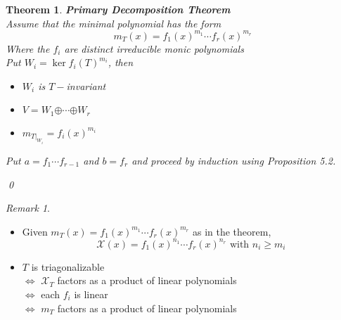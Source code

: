 \documentclass[11pt, a4paper]{report}
\makeatletter
\numberwithin{equation}{section}
\renewcommand{\chi}{\mathcal{X}}
\newcommand{\opl}{\boldsymbol{\oplus}}
\numberwithin{equation}{subsection}
\theoremstyle{plain}
\newtheorem{thm}{Theorem}[chapter] %
\theoremstyle{definition}
\theoremstyle{remark}
\newtheorem*{rem}{Remark}
\newtheorem*{prf}{Proof}
\renewenvironment{prf}[1][\proofname]{\par
  \vspace{-\topsep}%
  \normalfont
  \topsep0pt \partopsep0pt %
  \trivlist
  \item[\hskip\labelsep
        \itshape
    #1\@addpunct{.}]\ignorespaces
}{%
  \popQED\endtrivlist\@endpefalse
  \addvspace{6pt plus 6pt} %
}
\newcommand{\pr}[1]{\begin{adjustwidth}{1cm}{} \begin{prf} #1 \end{prf} \end{adjustwidth}}
\makeatother
\begin{document}
\newpage

\begin{thm}\textnormal{\textbf{Primary Decomposition Theorem}}\\
Assume that the minimal polynomial has the form
$$m_T(x) = f_1(x)^{m_1} \cdots f_r(x)^{m_r}$$
Where the $f_i$ are distinct irreducible monic polynomials\\
Put $W_i = \ker f_i(T)^{m_i}$, then
\begin{itemize}
\item $W_i$ is $T-$invariant
\item $V = W_1 \opl \cdots \opl W_r$
\item $m_{T|_{W_i}} = f_i(x)^{m_i}$
\end{itemize}

\pr{
Put $a = f_1 \cdots f_{r-1}$ and $b = f_r$ and proceed by induction using Proposition 5.2.
}\qed
\end{thm}

\begin{rem}${}$
\begin{itemize}
\item Given $m_T(x) = f_1(x)^{m_1} \cdots f_r(x)^{m_r}$ as in the theorem, $$\chi(x) = f_1(x)^{n_1} \cdots f_r(x)^{n_r} \text{ with } n_i \geq m_i$$
\pr{
}\vfill
\item 	$T$ is triagonalizable\\
		$\Leftrightarrow$ $\chi_T$ factors as a product of linear polynomials\\
		$\Leftrightarrow$ each $f_i$ is linear\\
		$\Leftrightarrow$ $m_T$ factors as a product of linear polynomials
\end{itemize}
\end{rem}



\newpage
\end{document}

